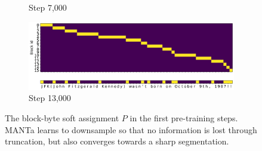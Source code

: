 \begin{figure}
\begin{subfigure}[b]{0.4\textwidth}
    \caption{Step 7,000}
    \end{subfigure}\hfill
    \begin{subfigure}[b]{0.4\textwidth}
    \includegraphics[width=\linewidth]{sources/part_2/manta/images/mapping_example_13000.png}
    \caption{Step 13,000}
    \end{subfigure}
    \caption{The block-byte soft assignment $P$ in the first pre-training steps. MANTa learns to downsample so that no information is lost through truncation, but also converges towards a sharp segmentation. }
    \label{fig:mapping_example}
\end{figure}
\fi

